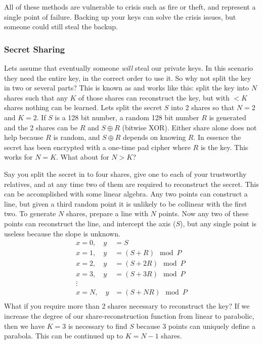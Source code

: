 All of these methods are vulnerable to crisis such as fire or theft, and represent a single point of failure. Backing up your keys can solve the crisis issues, but someone could still steal the backup. 

\subsubsection*{Secret Sharing}
Lets assume that eventually someone \textit{will} steal our private keys. In this scenario they need the entire key, in the correct order to use it. So why not split the key in two or several parts? This is known as  and works like this: split the key into $N$ shares such that any $K$ of those shares can reconstruct the key, but with $<K$ shares nothing can be learned. Lets split the secret $S$  into 2 shares so that $N=2$ and $K=2$. If $S$ is a 128 bit number, a random 128 bit number $R$ is generated and the 2 shares can be $R$ and $S\oplus R$ (bitwise XOR). Either share alone does not help because $R$ is random, and $S\oplus R$ depends on knowing $R$. In essence the secret has been encrypted with a one-time pad cipher where $R$ is the key. This works for $N=K$. What about for $N>K$?

Say you split the secret in to four shares, give one to each of your trustworthy relatives, and at any time two of them are required to reconstruct the secret. This can be accomplished with some linear algebra. Any two points can construct a line, but given a third random point it is unlikely to be collinear with the first two. To generate $N$ shares, prepare a line with $N$ points. Now any two of these points can reconstruct the line, and intercept the axis ($S$), but any single point is useless because the slope is unknown.
\begin{align*}
x=0,\quad y&=S\\
x=1,\quad y&=(S+R)\mod P\\
x=2,\quad y&=(S+2R)\mod P\\
x=3,\quad y&=(S+3R)\mod P\\
\vdots\\
x=N,\quad y&=(S+NR)\mod P\\
\end{align*}
What if you require more than 2 shares necessary to reconstruct the key? If we increase the degree of our share-reconstruction function from linear to parabolic, then we have $K=3$ is necessary to find $S$ because 3 points can uniquely define a parabola. This can be continued up to $K=N-1$ shares.



